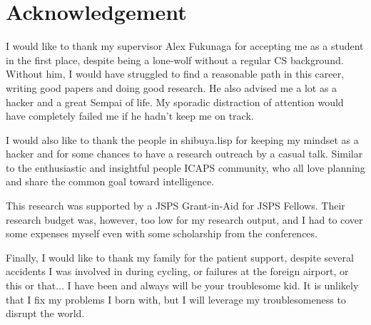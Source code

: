 
\chapter{Acknowledgement}

I would like to thank my supervisor Alex Fukunaga for accepting me as a
student in the first place, despite being a lone-wolf without a regular CS
background. Without him, I would have struggled to find a reasonable
path in this career, writing good papers and doing good research.
He also advised me a lot as a hacker and a great Sempai of life.
My sporadic distraction of attention would have completely failed me
if he hadn't keep me on track.

I would also like to thank the people in shibuya.lisp for keeping my
mindset as a hacker and for some chances to have a research outreach by
a casual talk. Similar to the enthusiastic and insightful people ICAPS community,
who all love planning and share the common goal toward intelligence.

This research was supported by a JSPS Grant-in-Aid for JSPS
Fellows. Their research budget was, however, too low for my research
output, and I had to cover some expenses myself even with some
scholarship from the conferences.

Finally, I would like to thank my family for the patient support,
despite several accidents I was involved in during cycling, or failures
at the foreign airport, or this or that...  I have been and always will
be your troublesome kid.  It is unlikely that I fix my problems I born
with, but I will leverage my troublesomeness to disrupt the world.

